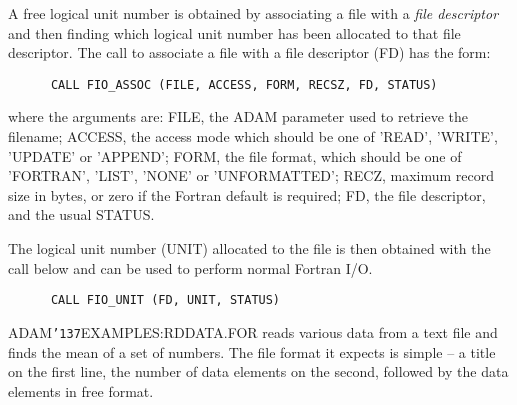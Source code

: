 \documentclass[twoside,11pt]{article}
\renewcommand{\_}{{\tt\char'137}}
\begin{document}
A free logical unit number is obtained by associating a file with a {\sl file
descriptor\/} and then finding which logical unit number has been allocated to 
that file descriptor.
The call to associate a file with a file descriptor (FD) has the form:
\begin{verbatim}
      CALL FIO_ASSOC (FILE, ACCESS, FORM, RECSZ, FD, STATUS)
\end{verbatim}
where the arguments are: FILE, the ADAM parameter used to retrieve the 
filename; ACCESS, the access mode which should be one 
of 'READ', 'WRITE', 'UPDATE' or 'APPEND';
FORM, the file format, which should be one of 'FORTRAN', 'LIST', 'NONE'
or 'UNFORMATTED';
RECZ, maximum record size in bytes, or zero if the Fortran default is required;
FD, the file descriptor, and the usual STATUS.

The logical unit number (UNIT) allocated to the file is then obtained with the 
call below and can be used to perform normal Fortran I/O.
\begin{verbatim}
      CALL FIO_UNIT (FD, UNIT, STATUS)      
\end{verbatim}

ADAM\_EXAMPLES:RDDATA.FOR reads various data from a text file and finds the 
mean of a set of numbers.
The file format it expects is simple -- a title on the 
first line, the number of data elements on the second, followed by the
data elements in free format.
\end{document}
